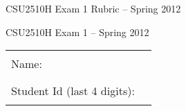 \documentclass[12pt]{article}                   %
\begin{document}
\vspace*{-1.5cm}
\ifrubric
\centerline{\Large CSU2510H Exam 1 Rubric -- Spring 2012}

\else
\centerline{\Large CSU2510H Exam 1 -- Spring 2012}

\vspace{0.5cm}

\begin{center}
\begin{tabular}{l@{\qquad}l}
Name:                        & \rule{174pt}{1pt} \\[.5cm]
Student Id (last 4 digits):  & \rule{174pt}{1pt} \\[.5cm]
\end{tabular}
\end{center}
\end{document}

